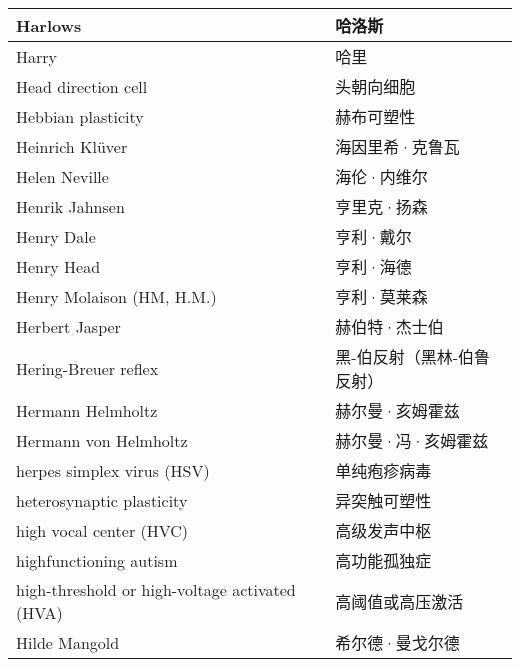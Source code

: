 \begin{longtable}{lll}
	\midrule
	Harlows    &&  哈洛斯  \\
	
	\midrule
	Harry    &&  哈里  \\
	
	\midrule
	Head direction cell    &&  头朝向细胞  \\
	
	\midrule
	Hebbian plasticity    &&  赫布可塑性  \\
	
	\midrule
	Heinrich Klüver    &&  海因里希·克鲁瓦  \\
	
	\midrule
	Helen Neville    &&  海伦·内维尔  \\
	
	\midrule
	Henrik Jahnsen    &&  亨里克·扬森  \\
	
	\midrule
	Henry Dale    &&  亨利·戴尔  \\
	
	\midrule
	Henry Head    &&  亨利·海德  \\
	
	\midrule
	Henry Molaison (HM, H.M.)   &&  亨利·莫莱森  \\
	
	\midrule
	Herbert Jasper     &&  赫伯特·杰士伯  \\
	
	\midrule
	Hering-Breuer reflex     &&  黑-伯反射（黑林-伯鲁反射）  \\
	
	\midrule
	Hermann Helmholtz     &&  赫尔曼·亥姆霍兹 \\
	
	\midrule
	Hermann von Helmholtz     &&  赫尔曼·冯·亥姆霍兹 \\
	
	\midrule
	herpes simplex virus (HSV)   &&  单纯疱疹病毒 \\
	
	\midrule
	heterosynaptic plasticity   &&  异突触可塑性 \\
	
	\midrule
	high vocal center (HVC)    &&  高级发声中枢  \\
	
	\midrule
	highfunctioning autism     &&  高功能孤独症  \\
	
	\midrule
	high-threshold or high-voltage activated (HVA)    &&  高阈值或高压激活  \\
	
	\midrule
	Hilde Mangold     &&  希尔德·曼戈尔德  \\
	

\end{longtable}
